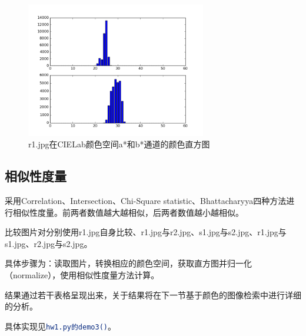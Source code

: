 \documentclass[a4paper, 12pt, UTF8]{article}
\begin{document}
\begin{enumerate}
\begin{figure}[h!]
    \centering
    \includegraphics[width=0.7\textwidth]{out/demo2_r1_Lab.png}
    \caption{r1.jpg在CIELab颜色空间a*和b*通道的颜色直方图}
    \label{figure_demo2_r1_Lab}
\end{figure}

\end{enumerate}


\subsection{相似性度量}

采用Correlation、Intersection、Chi-Square statistic、Bhattacharyya四种方法进行相似性度量。前两者数值越大越相似，后两者数值越小越相似。

比较图片对分别使用r1.jpg自身比较、r1.jpg与r2.jpg、s1.jpg与s2.jpg、r1.jpg与s1.jpg、r2.jpg与s2.jpg。

具体步骤为：读取图片，转换相应的颜色空间，获取直方图并归一化（normalize），使用相似性度量方法计算。

结果通过若干表格呈现出来，关于结果将在下一节基于颜色的图像检索中进行详细的分析。

具体实现见\lstinline[language=bash]{hw1.py的demo3()}。
\end{document}
